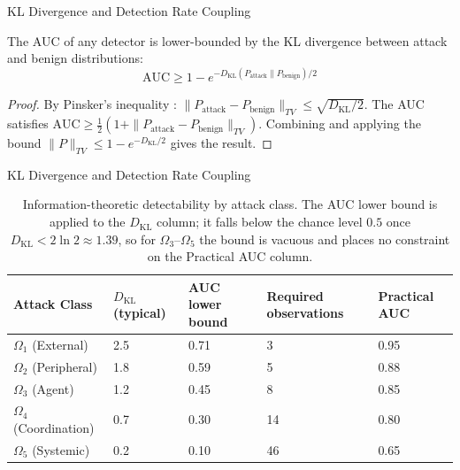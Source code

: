 \documentclass[
  ignorenonframetext,
]{beamer}
\providecommand{\cref}[1]{\texttt{\detokenize{#1}}}
\begin{document}
\begin{frame}[allowframebreaks]{KL Divergence and Detection Rate
Coupling}
\protect{}\label{kl-divergence-and-detection-rate-coupling}
\begin{theorem}
\label{thm:kl-auc-coupling}
The AUC of any detector is lower-bounded by the KL divergence between attack and benign distributions:
\begin{equation}
\label{eq:kl-auc-coupling}
\text{AUC} \geq 1 - e^{-D_{\mathrm{KL}}(P_{\text{attack}} \| P_{\text{benign}})/2}
\end{equation}
\end{theorem}

\begin{proof}
By Pinsker's inequality \cite{cover2006elements}: $\| P_{\text{attack}} - P_{\text{benign}} \|_{TV} \leq \sqrt{D_{\mathrm{KL}}/2}$. The AUC satisfies $\text{AUC} \geq \frac{1}{2}(1 + \|P_{\text{attack}} - P_{\text{benign}}\|_{TV})$. Combining and applying the bound $\|P\|_{TV} \leq 1 - e^{-D_{\mathrm{KL}}/2}$ gives the result.
\end{proof}

\end{frame}

\begin{frame}[allowframebreaks]{KL Divergence and Detection Rate
Coupling}
\begin{table}[htbp]
\centering
\caption{Information-theoretic detectability by attack class. The AUC lower bound is \cref{thm:kl-auc-coupling} applied to the $D_{\mathrm{KL}}$ column; it falls below the chance level $0.5$ once $D_{\mathrm{KL}} < 2\ln 2 \approx 1.39$, so for $\Omega_3$--$\Omega_5$ the bound is vacuous and places no constraint on the Practical AUC column.}
\label{tab:it-detectability}
\begin{tabular}{@{}lllll@{}}
\toprule
Attack Class & $D_{\mathrm{KL}}$ (typical) & AUC lower bound & Required observations & Practical AUC \\
\midrule
$\Omega_1$ (External) & 2.5 & 0.71 & 3 & 0.95 \\
$\Omega_2$ (Peripheral) & 1.8 & 0.59 & 5 & 0.88 \\
$\Omega_3$ (Agent) & 1.2 & 0.45 & 8 & 0.85 \\
$\Omega_4$ (Coordination) & 0.7 & 0.30 & 14 & 0.80 \\
$\Omega_5$ (Systemic) & 0.2 & 0.10 & 46 & 0.65 \\
\bottomrule
\end{tabular}
\end{table}
\end{frame}
\end{document}
